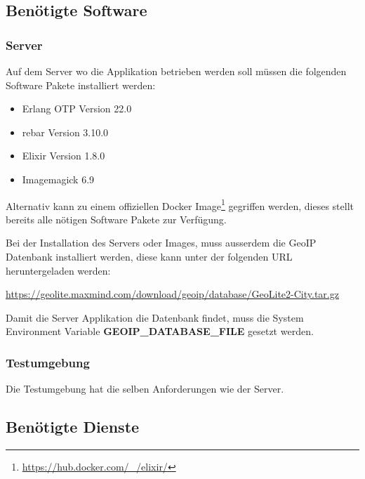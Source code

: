 \subsection{Benötigte Software}

\subsubsection{Server}

Auf dem Server wo die Applikation betrieben werden soll müssen die folgenden
Software Pakete installiert werden:

\begin{itemize}
  \tightlist{}
  \item{} Erlang OTP Version 22.0
  \item{} rebar Version 3.10.0
  \item{} Elixir Version 1.8.0
  \item{} Imagemagick 6.9
\end{itemize}

Alternativ kann zu einem offiziellen Docker Image\footnote{\url{https://hub.docker.com/\_/elixir/}}
gegriffen werden, dieses stellt bereits alle nötigen Software Pakete zur
Verfügung.

Bei der Installation des Servers oder Images, muss ausserdem die GeoIP
Datenbank installiert werden, diese kann unter der folgenden URL
heruntergeladen werden:

\url{https://geolite.maxmind.com/download/geoip/database/GeoLite2-City.tar.gz}

Damit die Server Applikation die Datenbank findet, muss die System Environment
Variable \textbf{GEOIP\_DATABASE\_FILE} gesetzt werden.

\subsubsection{Testumgebung}

Die Testumgebung hat die selben Anforderungen wie der Server.



\clearpage
\subsection{Benötigte Dienste}

